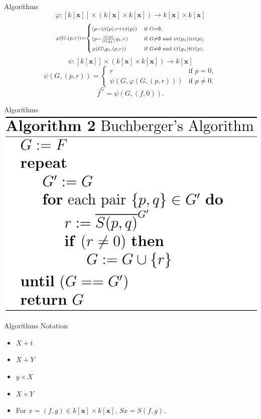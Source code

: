 \documentclass{beamer}
\newcommand{\LT}{\ensuremath{\text{\sc lt}}}
\def\and{\text{ and }}
\def\p{\varphi}
\begin{document}
\begin{frame}{Algorithms}
  \[ \scriptstyle \p: [k[\mathbf x]] \times \left( k[\mathbf x] \times k[\mathbf x] \right) \to k[\mathbf x] \times k[\mathbf x] \]
  \[ \scriptstyle \p(G,(p,r)) = \begin{cases}\scriptstyle (p-\LT(p),r+\LT(p)) &\scriptstyle\text{if } G = \emptyset, \\ \scriptstyle (p-\frac{\LT(p)}{\LT(g_1)}g_1,r) &\scriptstyle\text{if } G \ne \emptyset \and \LT(g_1) \mid \LT(p), \\ \scriptstyle \p(G\setminus g_1,(p,r)) &\scriptstyle\text{if } G \ne \emptyset \and \LT(g_1) \nmid \LT(p). \end{cases} \]
  \[ \scriptstyle \psi: [k[\mathbf x]] \times \left( k[\mathbf x] \times k[\mathbf x] \right) \to k[\mathbf x] \]
  \[ \scriptstyle \psi(G,(p,r)) = \begin{cases} \scriptstyle r &\scriptstyle\text{if } p = 0, \\ \scriptstyle \psi(G,\p(G,(p,r))) &\scriptstyle\text{if } p \ne 0. \end{cases} \]
  \[ \scriptstyle \overline f^{G} = \psi(G,(f,0)). \]
\end{frame}

\begin{frame}{Algorithms}
  \includegraphics[width=.65\textwidth]{BuchbergersAlgorithm.png}
\end{frame}

\begin{frame}{Algorithms}
  Notation
  \begin{itemize}
    \item<2-> $X + t$
    \item<3-> $X + Y$
    \item<4-> $y \times X$
    \item<5-> $X \times Y$
    \item<6-> For $x = (f,g) \in k[\mathbf x] \times k[\mathbf x]$, $Sx = S(f,g)$.
  \end{itemize}
\end{frame}
\end{document}
